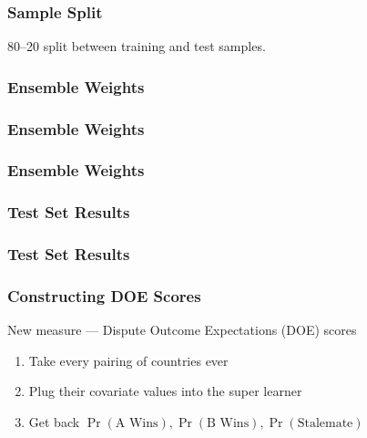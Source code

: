 \documentclass[10pt]{beamer}
\begin{document}
\begin{frame}
\begin{center}
  \end{center}
\end{frame}

\begin{frame}
  \frametitle{Sample Split}

  80--20 split between training and test samples.

  \begin{center}
    
  \end{center}
\end{frame}

\begin{frame}
  \frametitle{Ensemble Weights}

  \centering
  
\end{frame}

\begin{frame}
  \frametitle{Ensemble Weights}

  \centering
  

  \vspace{-3em}
  
\end{frame}

\begin{frame}
  \frametitle{Ensemble Weights}

  \centering
  
\end{frame}

\begin{frame}
  \frametitle{Test Set Results}

  \centering
  
\end{frame}

\begin{frame}
  \frametitle{Test Set Results}

  \centering
\end{frame}

\begin{frame}
  \frametitle{Constructing DOE Scores}

  New measure --- Dispute Outcome Expectations (DOE) scores
  \begin{enumerate}
    \item Take every pairing of countries ever

    \item Plug their covariate values into the super learner

    \item Get back $\Pr(\text{A Wins}), \Pr(\text{B Wins}), \Pr(\text{Stalemate})$
  \end{enumerate}
\end{frame}
\end{document}
